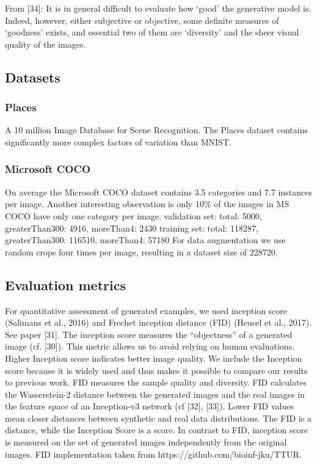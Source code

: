 \documentclass[12pt,a4paper]{article}
\begin{document}
From [34]: It is in general difficult to evaluate how ‘good’ the generative model is. Indeed, however, either subjective or objective, some definite measures of ‘goodness’ exists, and essential two of them are ‘diversity’ and the sheer visual quality of the images.
    
\subsection{Datasets}
\subsubsection{Places}
A 10 million Image Database for Scene Recognition. The Places dataset contains significantly more complex factors of variation than MNIST.

\subsubsection{Microsoft COCO}
On average the Microsoft COCO dataset \cite{1405.0312} contains 3.5 categories and 7.7 instances per image. Another interesting observation is only 10\% of the images in MS COCO have only one category per image.
validation set: total: 5000, greaterThan300: 4916, moreThan4: 2430
training set: total: 118287, greaterThan300: 116510, moreThan4: 57180
For data augmentation we use random crops four times per image, resulting in a dataset size of 228720.
    
\subsection{Evaluation metrics}
For quantitative assessment of generated examples, we used inception score (Salimans et al., 2016)
and Frechet inception distance (FID) (Heusel et al., 2017). See paper [31]. The inception score measures the “objectness” of a generated image (cf. [30]). This metric allows us to avoid relying on human evaluations. Higher Inception score indicates better image quality. We include the Inception score because it is widely used and thus makes it
possible to compare our results to previous work. FID measures the sample quality and diversity. FID calculates the Wasserstein-2 distance between the generated images and the real images in the feature space of an Inception-v3 network (cf [32], [33]). Lower FID values mean closer distances between synthetic and real data distributions. The FID is a distance, while the Inception Score is a score. In contrast to FID, inception score is
measured on the set of generated images independently from the original images.
FID implementation taken from https://github.com/bioinf-jku/TTUR.
\end{document}
